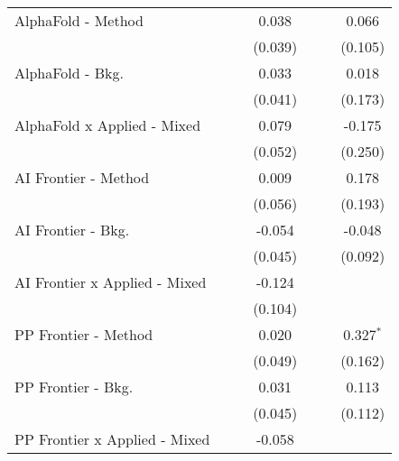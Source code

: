 \begin{tabular}{lcccccc}
   AlphaFold - Method             &               &         & 0.038         &              &         & 0.066\\   
                                  &               &         & (0.039)       &              &         & (0.105)\\   
   AlphaFold - Bkg.               &               &         & 0.033         &              &         & 0.018\\   
                                  &               &         & (0.041)       &              &         & (0.173)\\   
   AlphaFold x Applied - Mixed    &               &         & 0.079         &              &         & -0.175\\   
                                  &               &         & (0.052)       &              &         & (0.250)\\   
   AI Frontier - Method           &               &         & 0.009         &              &         & 0.178\\   
                                  &               &         & (0.056)       &              &         & (0.193)\\   
   AI Frontier - Bkg.             &               &         & -0.054        &              &         & -0.048\\   
                                  &               &         & (0.045)       &              &         & (0.092)\\   
   AI Frontier x Applied - Mixed  &               &         & -0.124        &              &         &   \\   
                                  &               &         & (0.104)       &              &         &   \\   
   PP Frontier - Method           &               &         & 0.020         &              &         & 0.327$^{*}$\\   
                                  &               &         & (0.049)       &              &         & (0.162)\\   
   PP Frontier - Bkg.             &               &         & 0.031         &              &         & 0.113\\   
                                  &               &         & (0.045)       &              &         & (0.112)\\   
   PP Frontier x Applied - Mixed  &               &         & -0.058        &              &         &   \\   

\end{tabular}
